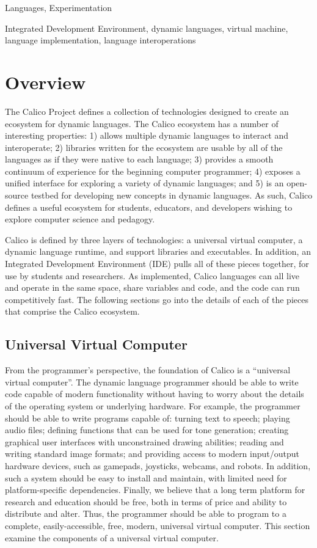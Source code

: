 \documentclass[preprint]{sigplanconf}
\begin{document}

\terms
Languages, Experimentation

\keywords 
Integrated Development Environment, dynamic languages,
virtual machine, language implementation, language interoperations

\section{Overview}

The Calico Project defines a collection of technologies designed to
create an ecosystem for dynamic languages. The Calico ecosystem has a
number of interesting properties: 1) allows multiple dynamic languages
to interact and interoperate; 2) libraries written for the ecosystem
are usable by all of the languages as if they were native to each
language; 3) provides a smooth continuum of experience for the
beginning computer programmer; 4) exposes a unified interface for
exploring a variety of dynamic languages; and 5) is an open-source
testbed for developing new concepts in dynamic languages. As such,
Calico defines a useful ecosystem for students, educators, and
developers wishing to explore computer science and pedagogy.

Calico is defined by three layers of technologies: a universal virtual
computer, a dynamic language runtime, and support libraries and
executables. In addition, an Integrated Development Environment (IDE)
pulls all of these pieces together, for use by students and researchers. As
implemented, Calico languages can all live and operate in the same
space, share variables and code, and the code can run competitively
fast. The following sections go into the details of each of the pieces
that comprise the Calico ecosystem.

\subsection{Universal Virtual Computer}

From the programmer's perspective, the foundation of Calico is a
``universal virtual computer''. The dynamic language programmer should
be able to write code capable of modern functionality without having
to worry about the details of the operating system or underlying
hardware. For example, the programmer should be able to write programs
capable of: turning text to speech; playing audio files; defining
functions that can be used for tone generation; creating graphical
user interfaces with unconstrained drawing abilities; reading and
writing standard image formats; and providing access to modern
input/output hardware devices, such as gamepads, joysticks, webcams,
and robots. In addition, such a system should be easy to install and
maintain, with limited need for platform-specific
dependencies. Finally, we believe that a long term platform for
research and education should be free, both in terms of price and
ability to distribute and alter. Thus, the programmer should be able
to program to a complete, easily-accessible, free, modern, universal
virtual computer. This section examine the components of a universal
virtual computer.
\end{document}
